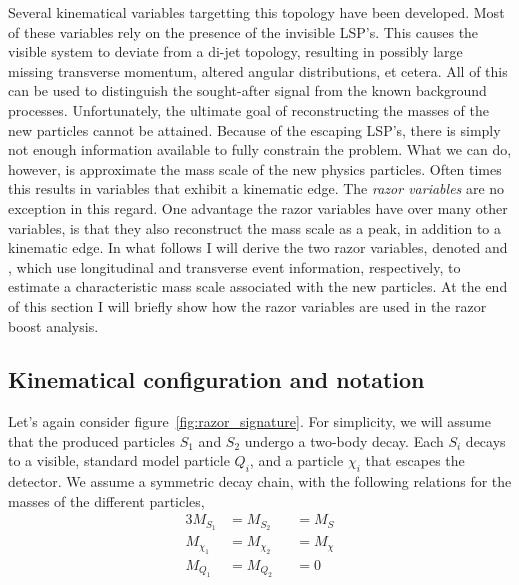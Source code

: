 Several kinematical variables targetting this topology have been developed.
Most of these variables rely on the presence of the invisible LSP's. This causes the visible system
to deviate from a di-jet topology, resulting in possibly large missing transverse momentum, altered
angular distributions, et cetera. All of this can be used to distinguish the sought-after signal
from the known background processes. 
Unfortunately, the ultimate goal of reconstructing the masses of the new particles cannot be
attained. Because of the escaping LSP's, there is simply not enough information available to fully
constrain the problem. What we can do, however, is approximate the mass scale of the new physics
particles. Often times this results in variables that exhibit a kinematic edge. 
The \textit{razor variables} \cite{rogan,Rogan:1557072,Chatrchyan:2011ek,Chatrchyan:2014goa} are no
exception in this regard. One advantage the razor variables have over many other variables, is that
they also reconstruct the mass scale as a peak, in addition to a kinematic edge. 
In what follows I will derive the two razor variables, denoted \mr and \rsq, which use longitudinal
and transverse event information, respectively, to estimate a characteristic mass scale associated
with the new particles. At the end of this section I will briefly show how the razor variables are
used in the razor boost analysis. 


\subsection{Kinematical configuration and notation \label{sec:razor_notation}}

Let's again consider figure~\ref{fig:razor_signature}. For simplicity, we will assume that the
produced particles $S_1$ and $S_2$ undergo a two-body decay. Each $S_i$ decays to a visible,
standard model particle $Q_i$, and a particle $\chi_i$ that escapes the detector. 
We assume a symmetric decay chain, with the following relations for the masses of the different
particles,
\begin{alignat}{3}
  M_{S_1} &= M_{S_2} &&= M_S \label{eq:equal_S_masses}\\
  M_{\chi_1} &= M_{\chi_2} &&= M_{\chi} \label{eq:equal_chi_masses}\\
  M_{Q_1} &= M_{Q_2} &&= 0 \label{eq:no_Q_masses}
\end{alignat}

